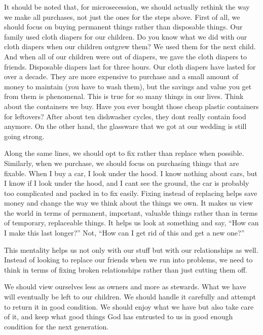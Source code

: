 {It should be noted that, for microsecession, we should actually rethink
the way we make all purchases, not just the ones for the steps above.
First of all, we should focus on buying permanent things rather than
disposable things. Our family used cloth diapers for our children. Do
you know what we did with our cloth diapers when our children outgrew
them?  We used them for the next child. And when all of our children
were out of diapers, we gave the cloth diapers to friends.
Disposable diapers
last for three hours. Our cloth diapers have lasted for over a decade.
They are more expensive to purchase and a small amount of money to
maintain (you have to wash them), but the savings and value you get
from them is phenomenal. This is true for so many things in our lives.
Think about the containers we buy. Have you ever bought those cheap
plastic containers for leftovers?  After about ten dishwasher cycles,
they don{\textquotesingle}t really contain food anymore. On the other
hand, the glassware that we got at our wedding is still going strong. 


Along the same lines, we should opt to fix rather than replace when
possible. Similarly, when we purchase, we should focus on purchasing
things that are fixable. When I buy a car, I look under the hood. I
know nothing about cars, but I know if I look under the hood, and I
can{\textquotesingle}t see the ground, the car is probably too
complicated and packed in to fix easily. Fixing instead of replacing
helps save money and
change the way we think about the things we own. It makes us view the
world in terms of permanent, important, valuable things rather than in
terms of temporary, replaceable things. It helps us look at
something and say,
“How can I make this last longer?” Not, “How can I get rid of this and
get a new one?”  


This mentality helps us not only with our
stuff but
with our
relationships as well. Instead of looking to replace our friends when
we run into problems,
we need to think in
terms of fixing broken relationships rather than just cutting them
off.


We should view ourselves less as owners and more as stewards. What we
have will eventually be left to our children. We should handle it
carefully and attempt to return it in good condition. We should enjoy
what we have but also take care of it, and keep what good things God
has entrusted to us in good enough condition for the next generation.


}
